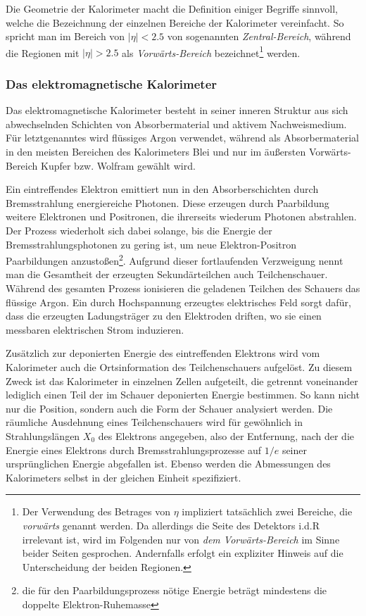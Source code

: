 Die Geometrie der Kalorimeter macht die Definition einiger Begriffe sinnvoll,
welche die Bezeichnung der einzelnen Bereiche der Kalorimeter vereinfacht. So
spricht man im Bereich von $|\eta|<2.5$ von sogenannten \emph{Zentral-Bereich},
während die Regionen mit $|\eta| > 2.5$ als \emph{Vorwärts-Bereich}
bezeichnet\footnote{Der Verwendung des Betrages von $\eta$ impliziert
tatsächlich zwei Bereiche, die \textit{vorwärts} genannt werden. Da allerdings
die Seite des Detektors i.d.R irrelevant ist, wird im Folgenden nur von 
\textit{dem Vorwärts-Bereich} im Sinne beider Seiten gesprochen. Andernfalls
erfolgt ein expliziter Hinweis auf die Unterscheidung der beiden Regionen.}
werden.

\subsubsection{Das elektromagnetische Kalorimeter}
Das elektromagnetische Kalorimeter besteht in seiner inneren Struktur aus sich
abwechselnden Schichten von Absorbermaterial und aktivem Nachweismedium. Für
letztgenanntes wird flüssiges Argon verwendet, während als Absorbermaterial in
den meisten Bereichen des Kalorimeters Blei und nur im äußersten
Vorwärts-Bereich Kupfer bzw. Wolfram gewählt wird.

Ein eintreffendes Elektron emittiert nun in den Absorberschichten durch
Bremsstrahlung energiereiche Photonen. Diese erzeugen durch Paarbildung weitere
Elektronen und Positronen, die ihrerseits wiederum Photonen abstrahlen. Der
Prozess wiederholt sich dabei solange, bis die Energie der
Bremsstrahlungsphotonen zu gering ist, um neue Elektron-Positron Paarbildungen
anzustoßen\footnote{die für den Paarbildungsprozess nötige Energie beträgt
mindestens die doppelte Elektron-Ruhemasse}. Aufgrund dieser fortlaufenden
Verzweigung nennt man die Gesamtheit der erzeugten Sekundärteilchen auch
Teilchenschauer. Während des gesamten Prozess ionisieren die geladenen Teilchen
des Schauers das flüssige Argon. Ein durch Hochspannung erzeugtes elektrisches
Feld sorgt dafür, dass die erzeugten Ladungsträger zu den Elektroden driften,
wo sie einen messbaren elektrischen Strom induzieren.

Zusätzlich zur deponierten Energie des eintreffenden Elektrons wird vom
Kalorimeter auch die Ortsinformation des Teilchenschauers aufgelöst. Zu diesem
Zweck ist das Kalorimeter in einzelnen Zellen aufgeteilt, die getrennt
voneinander lediglich einen Teil der im Schauer deponierten Energie bestimmen.
So kann nicht nur die Position, sondern auch die Form der Schauer analysiert
werden. Die räumliche Ausdehnung eines Teilchenschauers wird für gewöhnlich in
Strahlungslängen $X_0$ des Elektrons angegeben, also der Entfernung, nach der
die Energie eines Elektrons durch Bremsstrahlungsprozesse auf $1/e$ seiner
ursprünglichen Energie abgefallen ist. Ebenso werden die Abmessungen des
Kalorimeters selbst in der gleichen Einheit spezifiziert.

